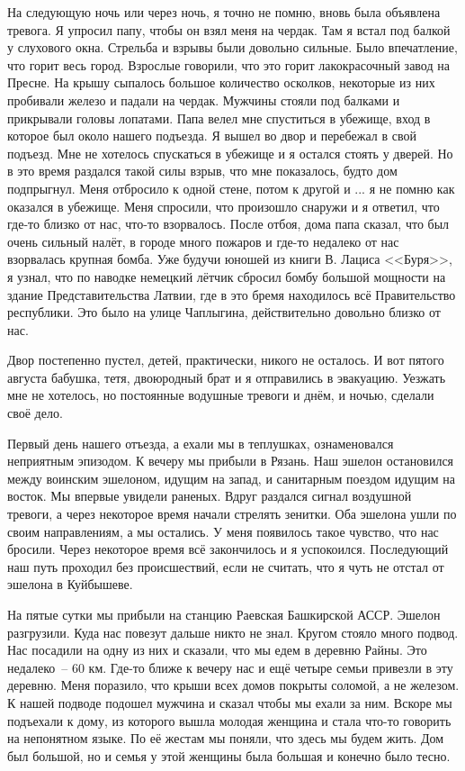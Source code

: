На следующую ночь или через ночь, я точно не помню, вновь была объявлена тревога. Я упросил папу, чтобы он взял меня на чердак. Там я встал под балкой у слухового окна. Стрельба и взрывы были довольно сильные. Было впечатление, что горит весь город. Взрослые говорили, что это горит лакокрасочный завод на Пресне. На крышу сыпалось большое количество осколков, некоторые из них пробивали железо и падали на чердак. Мужчины стояли под балками и прикрывали головы лопатами. Папа велел мне спуститься в убежище, вход в которое был около нашего подъезда. Я вышел во двор и перебежал в свой подъезд. Мне не хотелось спускаться в убежище и я остался стоять у дверей. Но в это время раздался такой силы взрыв, что мне показалось, будто дом подпрыгнул. Меня отбросило к одной стене, потом к другой и ... я не помню как оказался в убежище. Меня спросили, что произошло снаружи и я ответил, что где-то близко от нас, что-то взорвалось. После отбоя, дома папа сказал, что был очень сильный налёт, в городе много пожаров и где-то недалеко от нас взорвалась крупная бомба. Уже будучи юношей из книги В. Лациса <<Буря>>, я узнал, что по наводке немецкий лётчик сбросил бомбу большой мощности на здание Представительства Латвии, где в это бремя находилось всё Правительство республики. Это было на улице Чаплыгина, действительно довольно близко от нас.

Двор постепенно пустел, детей, практически, никого не осталось. И вот пятого августа бабушка, тетя, двоюродный брат и я отправились в эвакуацию. Уезжать мне не хотелось, но постоянные водушные тревоги и днём, и ночью, сделали своё дело.

Первый день нашего отъезда, а ехали мы в теплушках, ознаменовался неприятным эпизодом. К вечеру мы прибыли в Рязань. Наш эшелон остановился между воинским эшелоном, идущим на запад, и санитарным поездом идущим на восток. Мы впервые увидели раненых. Вдруг раздался сигнал воздушной тревоги, а через некоторое время начали стрелять зенитки. Оба эшелона ушли по своим направлениям, а мы остались. У меня появилось такое чувство, что нас бросили. Через некоторое время всё закончилось и я успокоился. Последующий наш путь проходил без происшествий, если не считать, что я чуть не отстал от эшелона в Куйбышеве.

На пятые сутки мы прибыли на станцию Раевская Башкирской АССР. Эшелон разгрузили. Куда нас повезут дальше никто не знал. Кругом стояло много подвод. Нас посадили на одну из них и сказали, что мы едем в деревню Райны. Это недалеко~-- 60 км. Где-то ближе к вечеру нас и ещё четыре семьи привезли в эту деревню. Меня поразило, что крыши всех домов покрыты соломой, а не железом. К нашей подводе подошел мужчина и сказал чтобы мы ехали за ним. Вскоре мы подъехали к дому, из которого вышла молодая женщина и стала что-то говорить на непонятном языке. По её жестам мы поняли, что здесь мы будем жить. Дом был большой, но и семья у этой женщины была большая и конечно было тесно.

